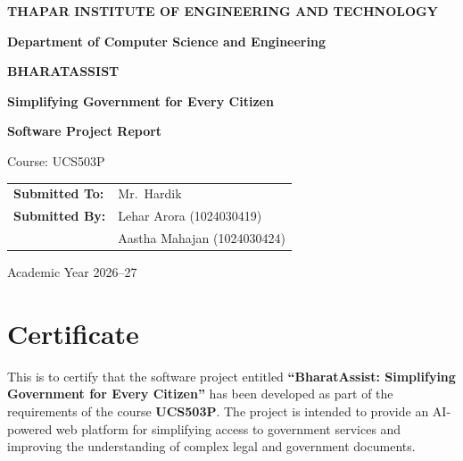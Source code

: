 \documentclass[12pt,a4paper]{report}
\begin{document}
\begin{titlepage}
    \centering
    \vspace*{1cm}

    {\Large \textbf{THAPAR INSTITUTE OF ENGINEERING AND TECHNOLOGY}\par}
    \vspace{0.5cm}
    {\large \textbf{Department of Computer Science and Engineering}\par}

    \vspace{1.5cm}

    {\Huge \textbf{BHARATASSIST}\par}
    \vspace{0.4cm}
    {\Large \textbf{Simplifying Government for Every Citizen}\par}

    \vspace{1.2cm}

    {\Large \textbf{Software Project Report}\par}
    \vspace{0.5cm}
    {\large Course: UCS503P\par}

    \vfill

    \begin{tabular}{ll}
        \textbf{Submitted To:} & Mr.\ Hardik \\[0.3cm]
        \textbf{Submitted By:} & Lehar Arora \quad (1024030419) \\
                               & Aastha Mahajan \quad (1024030424)
    \end{tabular}

    \vfill

    {\large Academic Year 2026--27\par}
\end{titlepage}

\chapter*{Certificate}

This is to certify that the software project entitled \textbf{``BharatAssist: Simplifying Government for Every Citizen''} has been developed as part of the requirements of the course \textbf{UCS503P}. The project is intended to provide an AI-powered web platform for simplifying access to government services and improving the understanding of complex legal and government documents.
\end{document}

